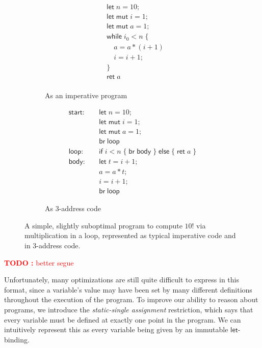 \documentclass[acmsmall,screen,review]{acmart}
\newcounter{todos}
\newcommand{\TODO}[1]{{
  \stepcounter{todos}
  \begin{center}\large{\textcolor{red}{\textbf{TODO \arabic{todos}:} #1}}\end{center}
}}
\newcommand{\ms}[1]{\ensuremath{\mathsf{#1}}}
\begin{document}
\begin{figure}
  \begin{subfigure}[t]{.5\textwidth}
    \begin{align*}
      & \ms{let}\;n = 10; \\
      & \ms{let\;mut}\;i = 1; \\
      & \ms{let\;mut}\;a = 1; \\
      & \ms{while}\;i_0 < n\;\{ \\
      & \quad a = a * (i + 1) \\
      & \quad i = i + 1; \\
      & \} \\
      & \ms{ret}\;a \\
    \end{align*}
    \caption{As an imperative program}
    \label{fig:fact-imp}
  \end{subfigure}%
  \begin{subfigure}[t]{.5\textwidth}
    \begin{align*}
      \ms{start}:\quad  & \ms{let}\;n = 10; \\
                        & \ms{let\;mut}\;i = 1; \\
                        & \ms{let\;mut}\;a = 1; \\
                        & \ms{br}\;\ms{loop} \\
      \ms{loop}: \quad  & \ms{if}\;i < n\;
                          \{\;\ms{br}\;\ms{body}\;\}\;
                          \ms{else}\;\{\;\ms{ret}\;a\;\} \\
      \ms{body}: \quad  & \ms{let}\;t = i + 1; \\
                        & a = a * t; \\
                        & i = i + 1; \\
                        & \ms{br}\;\ms{loop}
    \end{align*}
    \caption{As 3-address code}
    \label{fig:fact-3addr}
  \end{subfigure}
  \caption{
    A simple, slightly suboptimal program to compute $10!$ via multiplication in a loop, represented
    as typical imperative code and in 3-address code.
  }
  \Description{}
  \label{fig:fact-program}
\end{figure}

\TODO{better segue}

Unfortunately, many optimizations are still quite difficult to express in this format, since a
variable's value may have been set by many different definitions throughout the execution of the
program. To improve our ability to reason about programs, we introduce the \textit{static-single
assignment} restriction, which says that every variable must be defined at exactly one point in the
program. We can intuitively represent this as every variable being given by an immutable
\ms{let}-binding.
\end{document}
